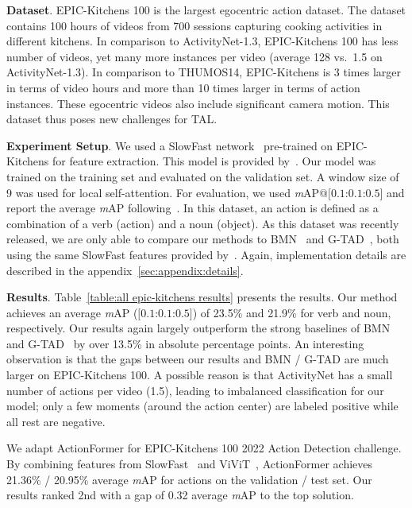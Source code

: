 \smallskip
\noindent \textbf{Dataset}.
EPIC-Kitchens 100 is the largest egocentric action dataset. The dataset contains 100 hours of videos from 700 sessions capturing cooking activities in different kitchens. In comparison to ActivityNet-1.3, EPIC-Kitchens 100 has less number of videos, yet many more instances per video (average 128 vs.\ 1.5 on ActivityNet-1.3). In comparison to THUMOS14, EPIC-Kitchens is 3 times larger in terms of video hours and more than 10 times larger in terms of action instances. These egocentric videos also include significant camera motion. This dataset thus poses new challenges for TAL. 

\smallskip
\noindent \textbf{Experiment Setup}.
We used a SlowFast network~\cite{slowfasticcv2019} pre-trained on EPIC-Kitchens for feature extraction. This model is provided by~\cite{epicarxiv2020}. %
Our model was trained on the training set and evaluated on the validation set. A window size of 9 was used for local self-attention. For evaluation, we used \textit{m}AP@$[0.1$:$0.1$:$0.5]$ and report the average \textit{m}AP following~\cite{epicarxiv2020}. In this dataset, an action is defined as a combination of a verb (action) and a noun (object). As this dataset was recently released, we are only able to compare our methods to BMN~\cite{bmniccv2019} and G-TAD~\cite{gtadcvpr2020}, both using the same SlowFast features provided by~\cite{epicarxiv2020}. Again, implementation details are described in the appendix~\ref{sec:appendix:details}.


\smallskip
\noindent \textbf{Results}.
Table~\ref{table:all epic-kitchens results} presents the results. Our method achieves an average \textit{m}AP ($[0.1$:$0.1$:$0.5]$) of 23.5\% and 21.9\% for verb and noun, respectively. Our results again largely outperform the strong baselines of BMN~\cite{bmniccv2019} and G-TAD~\cite{gtadcvpr2020} by over 13.5\% in absolute percentage points. An interesting observation is that the gaps between our results and BMN / G-TAD are much larger on EPIC-Kitchens 100. A possible reason is that ActivityNet has a small number of actions per video (1.5), leading to imbalanced classification for our model; only a few moments (around the action center) are labeled positive while all rest are negative.

We adapt ActionFormer for EPIC-Kitchens 100 2022 Action Detection challenge. By combining features from SlowFast~\cite{slowfasticcv2019} and ViViT~\cite{arnab2021vivit}, ActionFormer achieves 21.36\% / 20.95\% average \textit{m}AP for actions on the validation / test set. Our results ranked 2nd with a gap of 0.32 average \textit{m}AP to the top solution.

